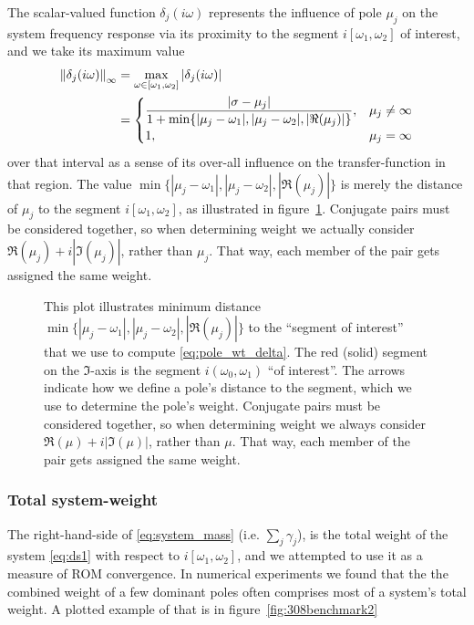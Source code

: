 The scalar-valued function $\delta_j(i\omega)$ represents the influence of pole $\mu_j$ on the system frequency response via its proximity to the segment $i[\omega_1,\omega_2]$ of interest, and we take its maximum value 
\begin{align}
\left\| \delta_j(i\omega) \right\|_{\infty} &= \max_{\omega\in [\omega_1,\omega_2]}| \delta_j(i\omega)|\nonumber\\
&= \begin{cases}
\dfrac{| \sigma-\mu_j|}{1+\min\{|\mu_j-\omega_1|,|\mu_j -\omega_2|,|\Re(\mu_j)|  \}},   & \mu_j \neq \infty\\
1, & \mu_j = \infty
\end{cases}
\label{eq:pole_wt_delta}
\end{align}
over that interval as a sense of its over-all influence on the transfer-function in that region.
The value $\min\{|\mu_j-\omega_1|,|\mu_j -\omega_2|,|\Re(\mu_j)|  \}$ is merely the distance of $\mu_j$ to the segment $i[\omega_1,\omega_2]$, as illustrated in figure~\ref{fig:MDI_examp}.  Conjugate pairs must be considered together, so when determining weight we actually consider $\Re(\mu_j)+ i|\Im(\mu_j) |$, rather than $\mu_j$. That way, each member of the pair gets assigned the same weight.
\begin{figure}
\centering
{}
\caption{\label{fig:MDI_examp} This plot illustrates minimum distance $\min\{|\mu_j-\omega_1|,|\mu_j -\omega_2|,|\Re(\mu_j)|  \}$  to the ``segment of interest'' that we use to compute \eqref{eq:pole_wt_delta}. The red (solid) segment on the $\Im$-axis is the segment $i(\omega_0, \omega_1)$ ``of interest''.  The arrows indicate how we define a pole's distance to the segment, which we use to determine the pole's weight. Conjugate pairs must be considered together, so when determining weight we always consider $\Re(\mu)+ i|\Im(\mu) |$, rather than $\mu$. That way, each member of the pair gets assigned the same weight.}
\end{figure}

\subsubsection{Total system-weight}
The right-hand-side of \eqref{eq:system_mass} (i.e. $\sum_j \gamma_j$),
 is the total weight of the system \eqref{eq:ds1} with respect to $ i[\omega_1,\omega_2]$, and we attempted to use it as a measure of ROM convergence.  In numerical experiments we found that the the combined weight of a few dominant poles often comprises most of a system's total weight.  A plotted example of that is in figure~\ref{fig:308benchmark2}


